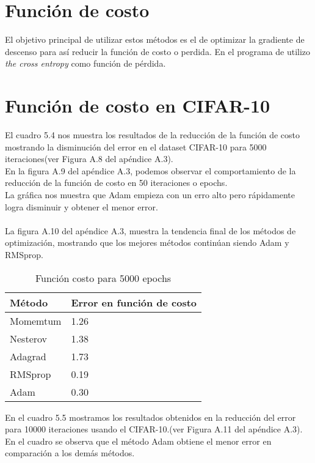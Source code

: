 \section{Función de costo}

El objetivo principal de utilizar estos métodos es el de optimizar la gradiente de descenso para así reducir la función de costo o perdida. En el programa de utilizo \textit{the cross entropy} como función de pérdida.

\section{Función de costo en CIFAR-10}
El cuadro 5.4 nos muestra los resultados de la reducción de la función de costo mostrando la disminución del error en el dataset CIFAR-10 para 5000 iteraciones(ver Figura A.8 del apéndice A.3).\\ En la figura A.9 del apéndice A.3, podemos observar el comportamiento de la reducción de la función de costo en 50 iteraciones o epochs.\\ La gráfica nos muestra que Adam empieza con un erro alto pero rápidamente logra disminuir y obtener el menor error.\\ \\

La figura A.10 del apéndice A.3, muestra la tendencia final de los métodos de optimización, mostrando que los mejores métodos continúan siendo Adam y RMSprop. 
\begin{table}[H]
	\centering
	\caption{Función costo para 5000 epochs}
	\label{my-label}
	\begin{centering}
		\begin{tabular}{@{}ll@{}}
			\toprule
			Método& Error en función de costo\\ \midrule
			Momemtum& 1.26 \\
			Nesterov& 1.38\\
			Adagrad&1.73   \\
			RMSprop& 0.19 \\
			Adam& 0.30 \\ \bottomrule
		\end{tabular}
	\end{centering}
	
\end{table}

En el cuadro 5.5 mostramos los resultados obtenidos en la reducción del error para 10000 iteraciones usando el CIFAR-10.(ver Figura A.11 del apéndice A.3). En el cuadro se observa que el método Adam obtiene el menor error en comparación a los demás métodos.

